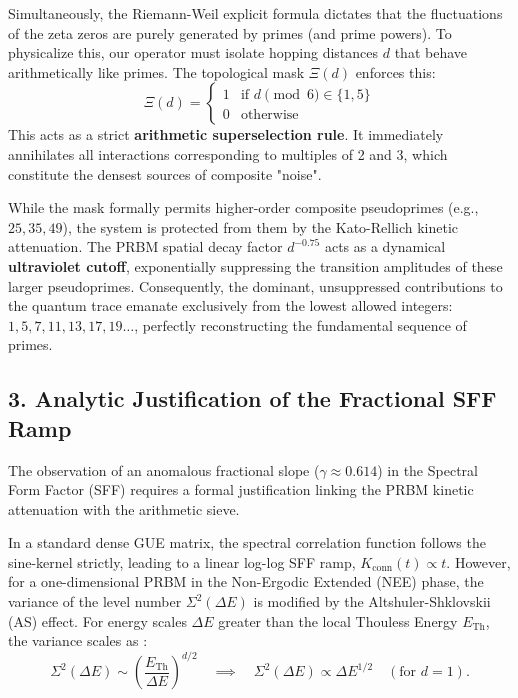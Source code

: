 \documentclass[aps,prl,preprint,superscriptaddress,floatfix]{revtex4-2}
\begin{document}
Simultaneously, the Riemann-Weil explicit formula dictates that the fluctuations of the zeta zeros are purely generated by primes (and prime powers). To physicalize this, our operator must isolate hopping distances $d$ that behave arithmetically like primes. The topological mask $\Xi(d)$ enforces this:
\begin{equation}
\Xi(d) = \begin{cases} 1 & \text{if } d \pmod 6 \in \{1, 5\} \\ 0 & \text{otherwise} \end{cases}
\end{equation}
This acts as a strict \textbf{arithmetic superselection rule}. It immediately annihilates all interactions corresponding to multiples of 2 and 3, which constitute the densest sources of composite "noise". 

While the mask formally permits higher-order composite pseudoprimes (e.g., $25, 35, 49$), the system is protected from them by the Kato-Rellich kinetic attenuation. The PRBM spatial decay factor $d^{-0.75}$ acts as a dynamical \textbf{ultraviolet cutoff}, exponentially suppressing the transition amplitudes of these larger pseudoprimes. Consequently, the dominant, unsuppressed contributions to the quantum trace emanate exclusively from the lowest allowed integers: $1, 5, 7, 11, 13, 17, 19\dots$, perfectly reconstructing the fundamental sequence of primes.

\subsection{3. Analytic Justification of the Fractional SFF Ramp}
The observation of an anomalous fractional slope ($\gamma \approx 0.614$) in the Spectral Form Factor (SFF) requires a formal justification linking the PRBM kinetic attenuation with the arithmetic sieve. 

In a standard dense GUE matrix, the spectral correlation function follows the sine-kernel strictly, leading to a linear log-log SFF ramp, $K_{\text{conn}}(t) \propto t$. However, for a one-dimensional PRBM in the Non-Ergodic Extended (NEE) phase, the variance of the level number $\Sigma^2(\Delta E)$ is modified by the Altshuler-Shklovskii (AS) effect. For energy scales $\Delta E$ greater than the local Thouless Energy $E_{\text{Th}}$, the variance scales as \cite{Kravtsov2015}:
\begin{equation}
\Sigma^2(\Delta E) \sim \left(\frac{E_{\text{Th}}}{\Delta E}\right)^{d/2} \quad \implies \quad \Sigma^2(\Delta E) \propto \Delta E^{1/2} \quad (\text{for } d=1).
\end{equation}
\end{document}
